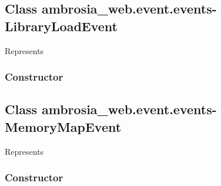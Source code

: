 \documentclass[letterpaper,10pt,english]{sphinxmanual}
\begin{document}
\subsection{Class ambrosia\_web.event.events-LibraryLoadEvent}
\label{ambrosia_web.event.events-LibraryLoadEvent:class-ambrosia-web-event-events-libraryloadevent}\label{ambrosia_web.event.events-LibraryLoadEvent::doc}
Represents {\hyperref[ambrosia_plugins.lkm:ambrosia_plugins.lkm.events.LibraryLoadEvent]{}}


\subsubsection{Constructor}
\label{ambrosia_web.event.events-LibraryLoadEvent:constructor}

\begin{fulllineitems}
\label{ambrosia_web.event.events-LibraryLoadEvent:ambrosia_web.event.events-LibraryLoadEvent}
\end{fulllineitems}



\subsection{Class ambrosia\_web.event.events-MemoryMapEvent}
\label{ambrosia_web.event.events-MemoryMapEvent::doc}\label{ambrosia_web.event.events-MemoryMapEvent:class-ambrosia-web-event-events-memorymapevent}
Represents {\hyperref[ambrosia_plugins.lkm:ambrosia_plugins.lkm.events.MemoryMapEvent]{}}


\subsubsection{Constructor}
\label{ambrosia_web.event.events-MemoryMapEvent:constructor}

\begin{fulllineitems}
\label{ambrosia_web.event.events-MemoryMapEvent:ambrosia_web.event.events-MemoryMapEvent}
\end{fulllineitems}
\end{document}
